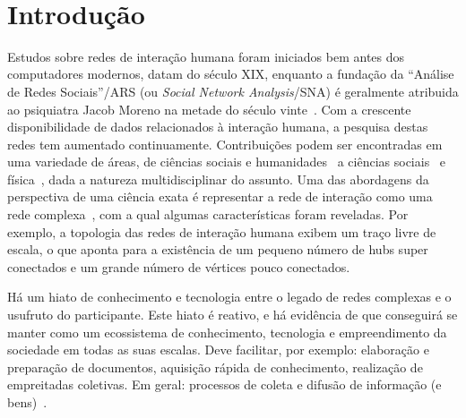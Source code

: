 \documentclass[a4paper,openright,12pt]{report} %
\begin{document}
\newpage\ \thispagestyle{empty}  \newpage\thispagestyle{empty}

\tableofcontents\thispagestyle{empty}\thispagestyle{empty}%

\clearpage \thispagestyle{empty}

\pagestyle{fancy}

\chapter{Introdução}
Estudos sobre redes de interação humana foram iniciados bem antes dos computadores modernos,
datam do século XIX, enquanto a fundação da ``Análise de Redes Sociais''/ARS (ou \emph{Social Network Analysis}/SNA)
é geralmente atribuida ao psiquiatra Jacob Moreno na metade do século vinte~\cite{newmanBook}.
Com a crescente disponibilidade de dados relacionados à interação humana, a pesquisa destas redes tem aumentado continuamente.
Contribuições podem ser encontradas em uma variedade de áreas, de ciências sociais e humanidades~\cite{latour2013}
a ciências sociais~\cite{bird} e física~\cite{barabasiHumanDyn,newmanFriendship},
dada a natureza multidisciplinar do assunto.
Uma das abordagens da perspectiva de uma ciência exata é representar a rede de interação como uma rede
complexa~\cite{barabasiHumanDyn,newmanFriendship},
com a qual algumas características foram reveladas.
Por exemplo, a topologia das redes de interação humana exibem um traço livre de escala,
o que aponta para a existência de um pequeno número de hubs super conectados
e um grande número de vértices pouco conectados.

Há um hiato de conhecimento e tecnologia entre o legado de redes complexas e o usufruto do participante.
Este hiato é reativo, e há evidência de que conseguirá se manter como um ecossistema de conhecimento, tecnologia
e empreendimento da sociedade em todas as suas escalas.
Deve facilitar, por exemplo:
elaboração e preparação de documentos, aquisição rápida de conhecimento,
realização de empreitadas coletivas.
Em geral: processos de coleta e difusão de informação (e bens)~\cite{pentland1,pentland2}.
\end{document}
